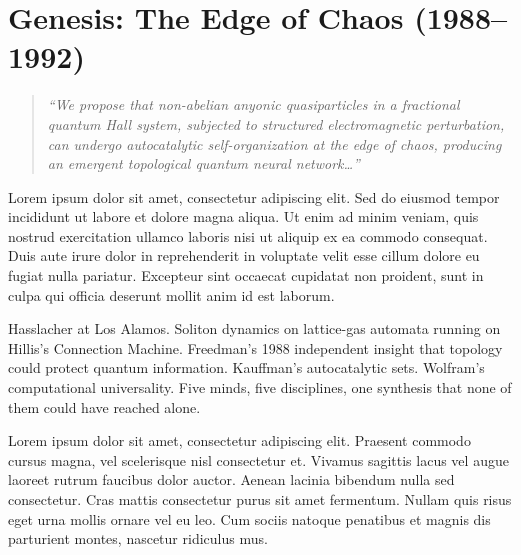 

\chapter{Genesis: The Edge of Chaos (1988--1992)}
\label{t1:ch01:genesis}

\begin{quote}\small\textit{%
``We propose that non-abelian anyonic quasiparticles in a fractional quantum Hall system, subjected to structured electromagnetic perturbation, can undergo autocatalytic self-organization at the edge of chaos, producing an emergent topological quantum neural network\ldots''
}\end{quote}

\vspace{0.5cm}


\vspace{0.5cm}

Lorem ipsum dolor sit amet, consectetur adipiscing elit. Sed do eiusmod tempor incididunt ut labore et dolore magna aliqua. Ut enim ad minim veniam, quis nostrud exercitation ullamco laboris nisi ut aliquip ex ea commodo consequat. Duis aute irure dolor in reprehenderit in voluptate velit esse cillum dolore eu fugiat nulla pariatur. Excepteur sint occaecat cupidatat non proident, sunt in culpa qui officia deserunt mollit anim id est laborum.

Hasslacher at Los Alamos. Soliton dynamics on lattice-gas automata running on Hillis's Connection Machine. Freedman's 1988 independent insight that topology could protect quantum information. Kauffman's autocatalytic sets. Wolfram's computational universality. Five minds, five disciplines, one synthesis that none of them could have reached alone.

Lorem ipsum dolor sit amet, consectetur adipiscing elit. Praesent commodo cursus magna, vel scelerisque nisl consectetur et. Vivamus sagittis lacus vel augue laoreet rutrum faucibus dolor auctor. Aenean lacinia bibendum nulla sed consectetur. Cras mattis consectetur purus sit amet fermentum. Nullam quis risus eget urna mollis ornare vel eu leo. Cum sociis natoque penatibus et magnis dis parturient montes, nascetur ridiculus mus.

